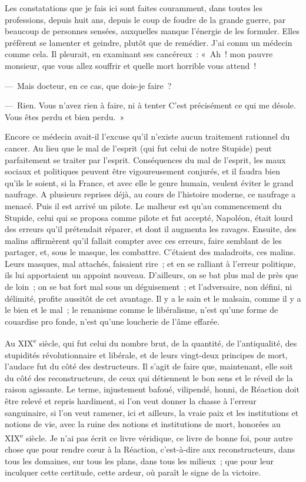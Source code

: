 \documentclass[french,twoside]{book} %
\newcommand\chapterclose{} %
\begin{document}
Les constatations que je fais ici sont faites couramment, dans toutes les professions, depuis huit ans, depuis le coup de foudre de la grande guerre, par beaucoup de personnes sensées, auxquelles manque l’énergie de les formuler. Elles préfèrent se lamenter et geindre, plutôt que de remédier. J’ai connu un médecin comme cela. Il pleurait, en examinant ses cancéreux : « Ah ! mon pauvre monsieur, que vous allez souffrir et quelle mort horrible vous attend !\par
— Mais docteur, en ce cas, que dois-je faire ?\par
— Rien. Vous n’avez rien à faire, ni à tenter C’est précisément ce qui me désole. Vous êtes perdu et bien perdu. »\par
Encore ce médecin avait-il l’excuse qu’il n’existe aucun traitement rationnel du cancer. Au lieu que le mal de l’esprit (qui fut celui de notre Stupide) peut parfaitement se traiter par l’esprit. Conséquences du mal de l’esprit, les maux sociaux et politiques peuvent être vigoureusement conjurés, et il faudra bien qu’ils le soient, si la France, et avec elle le genre humain, veulent éviter le grand naufrage. A plusieurs reprises déjà, au cours de l’histoire moderne, ce naufrage a menacé. Puis il est arrivé un pilote. Le malheur est qu’au commencement du Stupide, celui qui se proposa comme pilote et fut accepté, Napoléon, était lourd des erreurs qu’il prétendait réparer, et dont il augmenta les ravages. Ensuite, des malins affirmèrent qu’il fallait compter avec ces erreurs, faire semblant de les partager, et, sous le masque, les combattre. C’étaient des maladroits, ces malins. Leurs masques, mal attachés, faisaient rire ; et en se ralliant à l’erreur politique, ils lui apportaient un appoint nouveau. D’ailleurs, on se bat plus mal de près que de loin ; on se bat fort mal sous un déguisement ; et l’adversaire, non défini, ni délimité, profite aussitôt de cet avantage. Il y a le sain et le malsain, comme il y a le bien et le mal ; le renanisme comme le libéralisme, n’est qu’une forme de couardise pro fonde, n’est qu’une loucherie de l’âme effarée.\par
Au XIX\textsuperscript{e} siècle, qui fut celui du nombre brut, de la quantité, de l’antiqualité, des stupidités révolutionnaire et libérale, et de leurs vingt-deux principes de mort, l’audace fut du côté des destructeurs. Il s’agit de faire que, maintenant, elle soit du côté des reconstructeurs, de ceux qui détiennent le bon sens et le réveil de la raison agissante. Le terme, injustement bafoué, vilipendé, honni, de Réaction doit être relevé et repris hardiment, si l’on veut donner la chasse à l’erreur sanguinaire, si l’on veut ramener, ici et ailleurs, la vraie paix et les institutions et notions de vie, avec la ruine des notions et institutions de mort, honorées au XIX\textsuperscript{e} siècle. Je n’ai pas écrit ce livre véridique, ce livre de bonne foi, pour autre chose que pour rendre cœur à la Réaction, c’est-à-dire aux reconstructeurs, dans tous les domaines, sur tous les plans, dans tous les milieux ; que pour leur inculquer cette certitude, cette ardeur, où paraît le signe de la victoire.
\chapterclose
\end{document}
